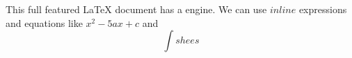 \markdownRendererUlBeginTight
\markdownRendererUlItem This full featured LaTeX document has a  engine.\markdownRendererUlItemEnd 
\markdownRendererUlItem We can use $inline$ expressions and equations like $x^2-5ax+c$ and $$\int shees$$\markdownRendererUlItemEnd 
\markdownRendererUlEndTight \relax